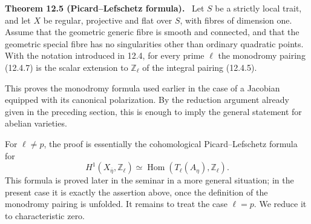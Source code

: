 \documentclass[11pt]{article}
\providecommand{\Hom}{\operatorname{Hom}}
\providecommand{\Z}{\mathbb Z}
\newenvironment{statement}[1]{\par\medskip\noindent\textbf{#1.}\ }{\par\medskip}
\begin{document}
\begin{statement}{Theorem 12.5 (Picard--Lefschetz formula)}
Let \(S\) be a strictly local trait, and let \(X\) be regular, projective and flat over \(S\), with fibres of dimension one.  Assume that the geometric generic fibre is smooth and connected, and that the geometric special fibre has no singularities other than ordinary quadratic points.  With the notation introduced in 12.4, for every prime \(\ell\) the monodromy pairing (12.4.7) is the scalar extension to \(\Z_\ell\) of the integral pairing (12.4.5).
\end{statement}

This proves the monodromy formula used earlier in the case of a Jacobian equipped with its canonical polarization.  By the reduction argument already given in the preceding section, this is enough to imply the general statement for abelian varieties.

For \(\ell\ne p\), the proof is essentially the cohomological Picard--Lefschetz formula for
\begin{equation}\tag{12.7.1}
        H^1(X_{\bar\eta},\Z_\ell)
        \simeq \Hom(T_\ell(A_\eta),\Z_\ell).
\end{equation}
This formula is proved later in the seminar in a more general situation; in the present case it is exactly the assertion above, once the definition of the monodromy pairing is unfolded.  It remains to treat the case \(\ell=p\).  We reduce it to characteristic zero.
\end{document}

